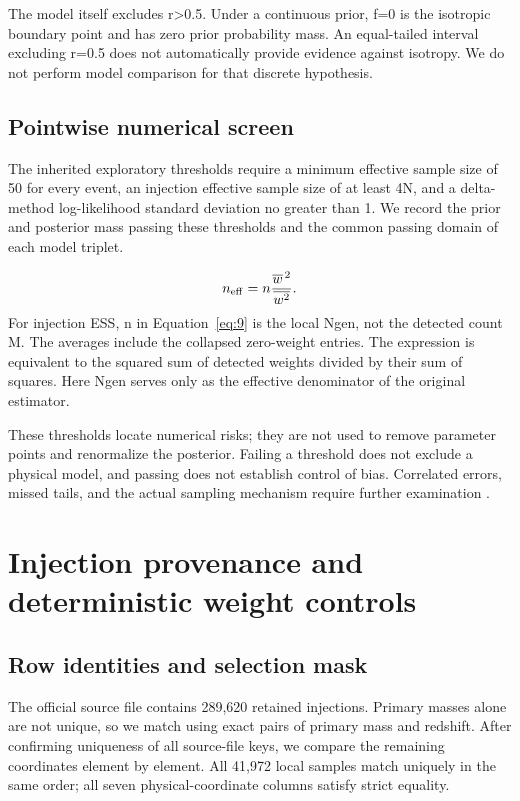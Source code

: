 \documentclass[a4paper,11pt]{article}
\begin{document}
The model itself excludes r>0.5. Under a continuous prior, f=0 is the isotropic boundary point and has zero prior probability mass. An equal-tailed interval excluding r=0.5 does not automatically provide evidence against isotropy. We do not perform model comparison for that discrete hypothesis.

\subsection{Pointwise numerical screen}\label{sec:4.3}
The inherited exploratory thresholds require a minimum effective sample size of 50 for every event, an injection effective sample size of at least 4N, and a delta-method log-likelihood standard deviation no greater than 1. We record the prior and posterior mass passing these thresholds and the common passing domain of each model triplet.

\begin{equation}\label{eq:9}
n_{\rm eff}=n\frac{\overline{w}^{\,2}}{\overline{w^2}}.
\end{equation}
For injection ESS, n in Equation~\eqref{eq:9} is the local Ngen, not the detected count M. The averages include the collapsed zero-weight entries. The expression is equivalent to the squared sum of detected weights divided by their sum of squares. Here Ngen serves only as the effective denominator of the original estimator.

These thresholds locate numerical risks; they are not used to remove parameter points and renormalize the posterior. Failing a threshold does not exclude a physical model, and passing does not establish control of bias. Correlated errors, missed tails, and the actual sampling mechanism require further examination \cite{ref3,ref4}.

\FloatBarrier
\section{Injection provenance and deterministic weight controls}\label{sec:5}
\subsection{Row identities and selection mask}\label{sec:5.1}
The official source file contains 289,620 retained injections. Primary masses alone are not unique, so we match using exact pairs of primary mass and redshift. After confirming uniqueness of all source-file keys, we compare the remaining coordinates element by element. All 41,972 local samples match uniquely in the same order; all seven physical-coordinate columns satisfy strict equality.
\end{document}
